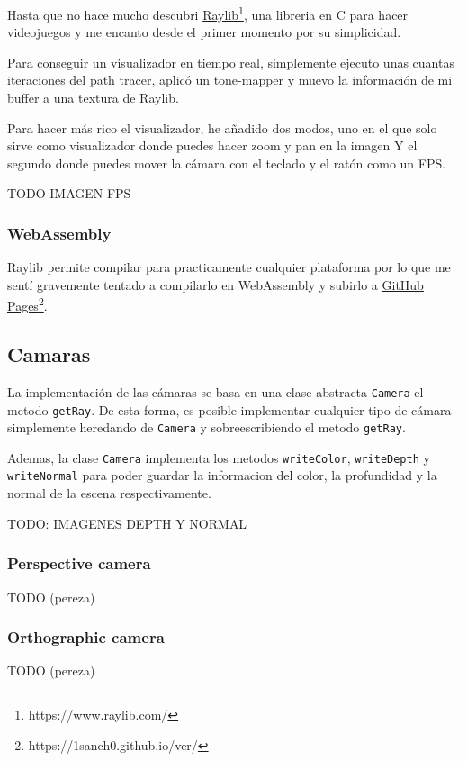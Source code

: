 \documentclass{article}
\begin{document}
Hasta que no hace mucho descubri \href{https://www.raylib.com/}{Raylib}\footnote{https://www.raylib.com/}, una libreria en C para hacer videojuegos y me encanto desde el primer momento por su simplicidad.

Para conseguir un visualizador en tiempo real, simplemente ejecuto unas cuantas iteraciones del path tracer, aplicó un tone-mapper y muevo la información de mi buffer a una textura de Raylib.

Para hacer más rico el visualizador, he añadido dos modos, uno en el que solo sirve como visualizador donde puedes hacer zoom y pan en la imagen Y el segundo donde puedes mover la cámara con el teclado y el ratón como un FPS.

TODO IMAGEN FPS

\subsubsection{WebAssembly}
Raylib permite compilar para practicamente cualquier plataforma por lo que me sentí gravemente tentado a compilarlo en WebAssembly y subirlo a \href{https://1sanch0.github.io/ver/}{GitHub Pages}\footnote{https://1sanch0.github.io/ver/}.

\subsection{Camaras}

La implementación de las cámaras se basa en una clase abstracta \texttt{Camera} 
el metodo \texttt{getRay}. De esta forma, es posible implementar cualquier tipo
de cámara simplemente heredando de \texttt{Camera} y sobreescribiendo el metodo
\texttt{getRay}.

Ademas, la clase \texttt{Camera} implementa los metodos \texttt{writeColor}, \texttt{writeDepth} y \texttt{writeNormal} para poder guardar la informacion del color, la profundidad y la normal de la escena respectivamente.

TODO: IMAGENES DEPTH Y NORMAL

\subsubsection{Perspective camera}
TODO (pereza)

\subsubsection{Orthographic camera}
TODO (pereza)
\end{document}
